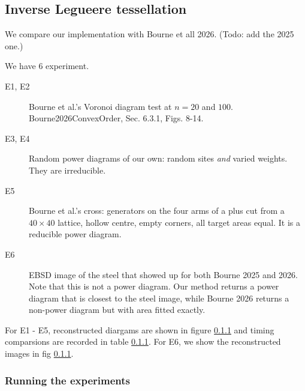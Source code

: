 \subsection{Inverse Legueere tessellation}

We compare our implementation with Bourne et all 2026. (Todo: add the 2025 one.)

We have 6 experiment. 
\begin{description}
\item[E1, E2] Bourne et al.'s Voronoi diagram test at $n=20$ and $100$. 
  Bourne2026ConvexOrder, Sec. 6.3.1, Figs. 8-14.
\item[E3, E4] Random power diagrams of our own: random sites \emph{and} varied
  weights. They are irreducible.
\item[E5] Bourne et al.'s cross: generators on the four arms of a plus cut from
  a $40\times40$ lattice, hollow centre, empty corners, all target areas equal.
  It is a reducible power diagram.
  
\item[E6] EBSD image of the steel that showed up for both Bourne 2025 and 2026. Note that this is not a power diagram. Our method returns a power diagram that is closest to the steel image, while Bourne 2026 returns a non-power diagram but with area fitted exactly.
\end{description}

For E1 - E5, reconstructed diargams are shown in figure \ref{} and timing comparsions are recorded in table \ref{}. For E6, we show the reconstructed images in fig \ref{}.


\subsubsection{Running the experiments}

